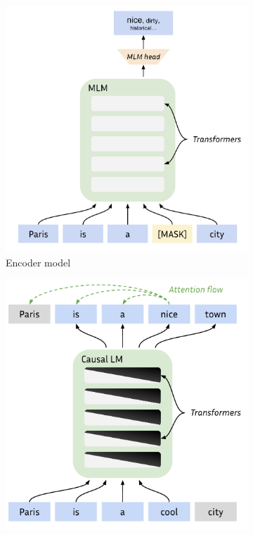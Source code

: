 \begin{figure}[ht]
    \centering
    \begin{subfigure}[b]{0.35\textwidth}
        \includegraphics[width=\textwidth]{sources/related_works/imgs/mlm.png}
        \caption{Encoder model}
        \label{fig:mlm}
    \end{subfigure}
    \begin{subfigure}[b]{0.35\textwidth}
        \includegraphics[width=\textwidth]{sources/related_works/imgs/gpt.pdf}

\end{subfigure}
\end{figure}
